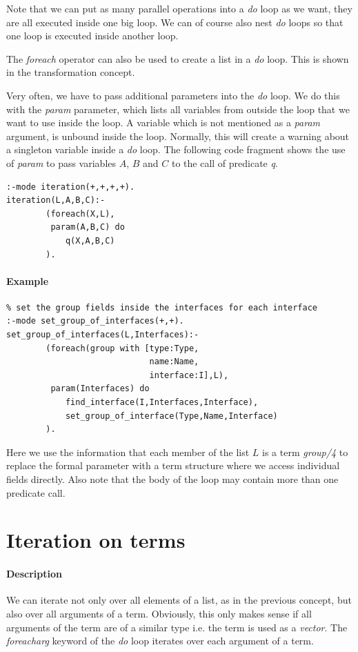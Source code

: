 \documentclass[a4paper,12pt]{report}
\begin{document}
Note that we can put as many parallel operations into a {\it do} loop as we want, they are all executed inside one big loop. We can of course also nest {\it do} loops so that one loop is executed inside another loop.

The {\it foreach} operator can also be used to create a list in a {\it do} loop. This is shown in the transformation concept.

Very often, we have to pass additional parameters into the {\it do} loop. We do this with the {\it param} parameter, which lists all variables from outside the loop that we want to use inside the loop. A variable which is not mentioned as a {\it param} argument, is unbound inside the loop. Normally, this will create a warning about a singleton variable inside a {\it do} loop. The following code fragment shows the use of {\it param} to pass variables $A$, $B$ and $C$ to the call of predicate {\it q}.
\begin{verbatim}
:-mode iteration(+,+,+,+).
iteration(L,A,B,C):-
        (foreach(X,L),
         param(A,B,C) do
            q(X,A,B,C)
        ).
\end{verbatim}
\paragraph{Example}
\begin{verbatim}
% set the group fields inside the interfaces for each interface
:-mode set_group_of_interfaces(+,+).
set_group_of_interfaces(L,Interfaces):-
        (foreach(group with [type:Type,
                             name:Name,
                             interface:I],L),
         param(Interfaces) do
            find_interface(I,Interfaces,Interface),
            set_group_of_interface(Type,Name,Interface)
        ).
\end{verbatim}
Here we use the information that each member of the list $L$ is a term {\it group/4} to replace the formal parameter with a term structure where we access individual fields directly. Also note that the body of the loop may contain more than one predicate call.
\pagebreak
\section{Iteration on terms}
\paragraph{Description}
We can iterate not only over all elements of a list, as in the previous concept, but also over all arguments of a term. Obviously, this only makes sense if all arguments of the term are of a similar type i.e. the term is used as a {\it  vector}. The {\it foreacharg} keyword of the {\it do} loop iterates over each argument of a term.
\end{document}
